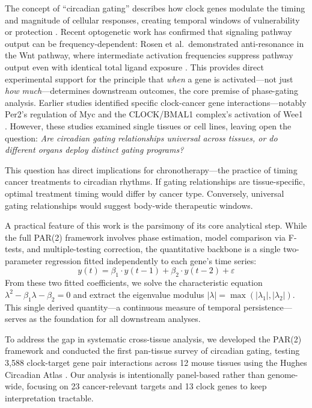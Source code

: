\documentclass[11pt,letterpaper]{article}
\begin{document}
The concept of ``circadian gating'' describes how clock genes modulate the timing and magnitude of cellular responses, creating temporal windows of vulnerability or protection \citep{janich2011}. Recent optogenetic work has confirmed that signaling pathway output can be frequency-dependent: Rosen et al.\ demonstrated anti-resonance in the Wnt pathway, where intermediate activation frequencies suppress pathway output even with identical total ligand exposure \citep{rosen2026}. This provides direct experimental support for the principle that \textit{when} a gene is activated---not just \textit{how much}---determines downstream outcomes, the core premise of phase-gating analysis. Earlier studies identified specific clock-cancer gene interactions---notably Per2's regulation of Myc \citep{fu2002} and the CLOCK/BMAL1 complex's activation of Wee1 \citep{matsuo2003}. However, these studies examined single tissues or cell lines, leaving open the question: \textit{Are circadian gating relationships universal across tissues, or do different organs deploy distinct gating programs?}

This question has direct implications for chronotherapy---the practice of timing cancer treatments to circadian rhythms. If gating relationships are tissue-specific, optimal treatment timing would differ by cancer type. Conversely, universal gating relationships would suggest body-wide therapeutic windows.

A practical feature of this work is the parsimony of its core analytical step. While the full PAR(2) framework involves phase estimation, model comparison via F-tests, and multiple-testing correction, the quantitative backbone is a single two-parameter regression fitted independently to each gene's time series:
\[
y(t) = \beta_1 \cdot y(t{-}1) + \beta_2 \cdot y(t{-}2) + \varepsilon
\]
From these two fitted coefficients, we solve the characteristic equation $\lambda^2 - \beta_1\lambda - \beta_2 = 0$ and extract the eigenvalue modulus $|\lambda| = \max(|\lambda_1|, |\lambda_2|)$. This single derived quantity---a continuous measure of temporal persistence---serves as the foundation for all downstream analyses.

To address the gap in systematic cross-tissue analysis, we developed the PAR(2) framework and conducted the first pan-tissue survey of circadian gating, testing 3,588 clock-target gene pair interactions across 12 mouse tissues using the Hughes Circadian Atlas \citep{zhang2014}. Our analysis is intentionally panel-based rather than genome-wide, focusing on 23 cancer-relevant targets and 13 clock genes to keep interpretation tractable.
\end{document}
